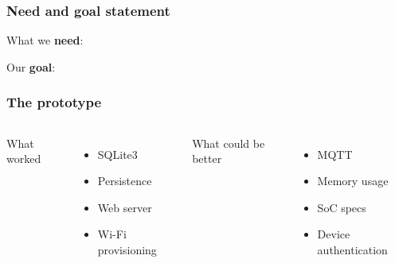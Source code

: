 \documentclass{beamer}
\begin{document}
\frame{\titlepage}

\begin{frame}
  \frametitle{Need and goal statement}

  What we
  \textbf{need}:
  
  \newline
  \newline
  Our
  \textbf{goal}:
  

\end{frame}

\begin{frame}
  \frametitle{The prototype}

  \begin{columns}
    What worked
    \begin{itemize}
      \item SQLite3
      \item Persistence
      \item Web server
      \item Wi-Fi provisioning
    \end{itemize}

    What could be better
    \begin{itemize}
      \item MQTT
      \item Memory usage
      \item SoC specs
      \item Device authentication
    \end{itemize}
  \end{columns}


\end{frame}
\end{document}
